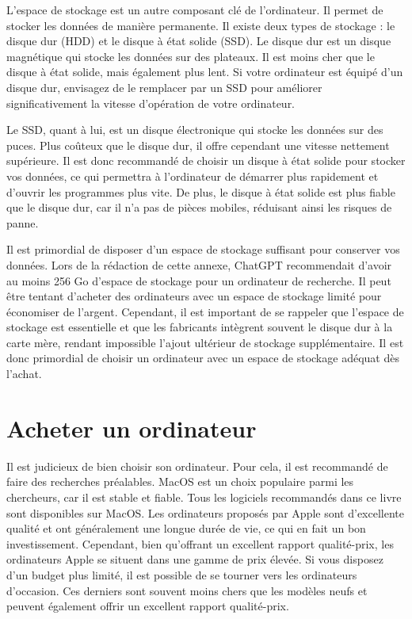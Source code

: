 \documentclass[
  letterpaper,
  DIV=11,
  numbers=noendperiod]{scrreprt}
\begin{document}
L'espace de stockage est un autre composant clé de l'ordinateur. Il
permet de stocker les données de manière permanente. Il existe deux
types de stockage : le disque dur (HDD) et le disque à état solide
(SSD). Le disque dur est un disque magnétique qui stocke les données sur
des plateaux. Il est moins cher que le disque à état solide, mais
également plus lent. Si votre ordinateur est équipé d'un disque dur,
envisagez de le remplacer par un SSD pour améliorer significativement la
vitesse d'opération de votre ordinateur.

Le SSD, quant à lui, est un disque électronique qui stocke les données
sur des puces. Plus coûteux que le disque dur, il offre cependant une
vitesse nettement supérieure. Il est donc recommandé de choisir un
disque à état solide pour stocker vos données, ce qui permettra à
l'ordinateur de démarrer plus rapidement et d'ouvrir les programmes plus
vite. De plus, le disque à état solide est plus fiable que le disque
dur, car il n'a pas de pièces mobiles, réduisant ainsi les risques de
panne.

Il est primordial de disposer d'un espace de stockage suffisant pour
conserver vos données. Lors de la rédaction de cette annexe, ChatGPT
recommendait d'avoir au moins 256 Go d'espace de stockage pour un
ordinateur de recherche. Il peut être tentant d'acheter des ordinateurs
avec un espace de stockage limité pour économiser de l'argent.
Cependant, il est important de se rappeler que l'espace de stockage est
essentielle et que les fabricants intègrent souvent le disque dur à la
carte mère, rendant impossible l'ajout ultérieur de stockage
supplémentaire. Il est donc primordial de choisir un ordinateur avec un
espace de stockage adéquat dès l'achat.

\section{Acheter un ordinateur}\label{acheter-un-ordinateur}

Il est judicieux de bien choisir son ordinateur. Pour cela, il est
recommandé de faire des recherches préalables. MacOS est un choix
populaire parmi les chercheurs, car il est stable et fiable. Tous les
logiciels recommandés dans ce livre sont disponibles sur MacOS. Les
ordinateurs proposés par Apple sont d'excellente qualité et ont
généralement une longue durée de vie, ce qui en fait un bon
investissement. Cependant, bien qu'offrant un excellent rapport
qualité-prix, les ordinateurs Apple se situent dans une gamme de prix
élevée. Si vous disposez d'un budget plus limité, il est possible de se
tourner vers les ordinateurs d'occasion. Ces derniers sont souvent moins
chers que les modèles neufs et peuvent également offrir un excellent
rapport qualité-prix.
\end{document}
